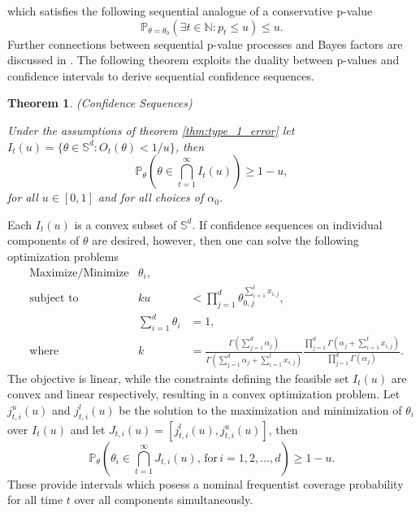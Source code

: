 \documentclass[11pt]{article}
\newtheorem{thm}{Theorem}[section]
\begin{document}
which satisfies the following sequential analogue of a conservative p-value
\begin{equation}
  \label{eq:conservative_p_value}
  \mathbb{P}_{\theta = \theta_0}\left( \exists t \in \mathbb{N}: p_t \leq u \right) \leq u.
\end{equation}
Further connections between sequential p-value processes and Bayes factors are discussed in \cite{shafer}.
The following theorem exploits the duality between p-values and confidence intervals to derive sequential confidence sequences.
\begin{thm}(Confidence Sequences)
  
  \label{thm:confidence_sequence}
  \noindent Under the assumptions of theorem \ref{thm:type_1_error} let $I_t(u) = \lbrace \theta \in \mathbb{S}^d : O_t(\theta) < 1/u  \rbrace$, then
\begin{equation}
  \label{eq:confidence_sequence}
  \mathbb{P}_{\theta}\left( \theta \in \bigcap_{t=1}^{\infty} I_t(u) \right) \geq 1- u,
\end{equation}
for all $u \in [0,1]$ and for all choices of $\alpha_0$. 
\end{thm}
\noindent Each $I_t(u)$ is a convex subset of $\mathbb{S}^d$. If confidence sequences on individual components of $\theta$ are desired, however, then one can solve the following
optimization problems
\begin{align*}
  &\text{Maximize/Minimize} &\theta_i, &\\
  &\text{subject to}  &ku &< \prod_{j=1}^{d} \theta_{0,j}^{\sum_{i=1}^{t}x_{i,j}},\\
    &              &\sum_{i=1}^{d}\theta_i &= 1,\\
  &\text{where} &k &= \frac{\Gamma(\sum_{j=1}^{d} \alpha_j)}{\Gamma(\sum_{j=1}^{d} \alpha_j + \sum_{i=1}^{t}x_{i,j})}\frac{\prod_{j=1}^{d}\Gamma(\alpha_j + \sum_{i=1}^{t}x_{i,j} )}{\prod_{j=1}^{d}\Gamma(\alpha_j )}.
\end{align*}
The objective is linear, while the constraints defining the feasible set $I_t(u)$ are convex and linear respectively, resulting in a convex optimization problem. Let $j^{u}_{t,i}(u)$ and $j^{l}_{t,i}(u)$ be the solution to the maximization and minimization of $\theta_i$ over $I_t(u)$ and let $J_{t,i}(u)=[j^{l}_{t,i}(u), j^{u}_{t,i}(u)]$, then
\begin{equation}
  \label{eq:marginal_confidence_sequence}
  \mathbb{P}_{\theta}\left( \theta_i \in \bigcap_{t=1}^{\infty} J_{t,i}(u),\, \text{for}\, i = 1,2, \dots, d \right) \geq 1- u.
\end{equation}
These provide intervals which posess a nominal frequentist coverage probability for all time $t$ over all components simultaneously. 
\end{document}
